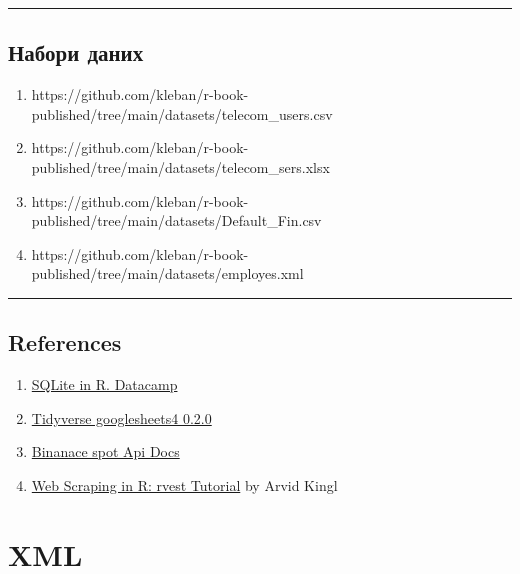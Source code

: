 \documentclass[
  letterpaper,
  DIV=11,
  numbers=noendperiod]{scrreprt}
\providecommand{\tightlist}{%
  \setlength{\itemsep}{0pt}\setlength{\parskip}{0pt}}\usepackage{longtable,booktabs,array}
\begin{document}
\begin{center}\rule{0.5\linewidth}{0.5pt}\end{center}

\section{Набори
даних}\label{ux43dux430ux431ux43eux440ux438-ux434ux430ux43dux438ux445-1}

\begin{enumerate}
\def\labelenumi{\arabic{enumi}.}
\tightlist
\item
  https://github.com/kleban/r-book-published/tree/main/datasets/telecom\_users.csv
\item
  https://github.com/kleban/r-book-published/tree/main/datasets/telecom\_sers.xlsx
\item
  https://github.com/kleban/r-book-published/tree/main/datasets/Default\_Fin.csv
\item
  https://github.com/kleban/r-book-published/tree/main/datasets/employes.xml
\end{enumerate}

\begin{center}\rule{0.5\linewidth}{0.5pt}\end{center}

\section{References}\label{references-1}

\begin{enumerate}
\def\labelenumi{\arabic{enumi}.}
\tightlist
\item
  \href{https://www.datacamp.com/community/tutorials/sqlite-in-r}{SQLite
  in R. Datacamp}
\item
  \href{https://www.tidyverse.org/blog/2020/05/googlesheets4-0-2-0/}{Tidyverse
  googlesheets4 0.2.0}
\item
  \href{https://github.com/binance/binance-spot-api-docs/blob/master/rest-api.md\#klinecandlestick-data}{Binanace
  spot Api Docs}
\item
  \href{https://www.datacamp.com/community/tutorials/r-web-scraping-rvest}{Web
  Scraping in R: rvest Tutorial} by Arvid Kingl
\end{enumerate}

\chapter{XML}\label{xml}
\end{document}
